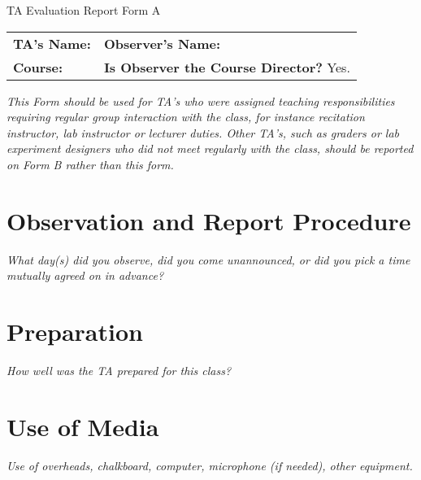 

\def\theta{\XXXnote{TA Name}}
\def\theobserver{\XXXnote{Observer Name}}
\def\thecourse{\XXXnote{Course Name}}



\pagestyle{taevaluation}
\thispagestyle{taevaluationfirst}

\vspace*{0.2in}
\begin{center}
{\LARGE TA Evaluation Report Form A}
\end{center}
\vspace*{0.1in}

\begin{tabularx}{\textwidth}{XX}

\textbf{TA's Name:} \theta{} &
\textbf{Observer's Name:} \theobserver{} \\[0.2in]

\textbf{Course:} \thecourse{} &
\textbf{Is Observer the Course Director?} Yes.\\[0.2in]

\end{tabularx}

\textit{This Form should be used for TA’s who were assigned teaching
responsibilities requiring regular group interaction with the class, for
instance recitation instructor, lab instructor or lecturer duties. Other
TA’s, such as graders or lab experiment designers who did not meet regularly
with the class, should be reported on Form B rather than this form.}

\section{Observation and Report Procedure}
\textit{What day(s) did you observe, did you come unannounced, or did you
pick a time mutually agreed on in advance?}


\section{Preparation}
\textit{How well was the TA prepared for this class?}


\section{Use of Media}
\textit{Use of overheads, chalkboard, computer, microphone (if needed), other
equipment.}


